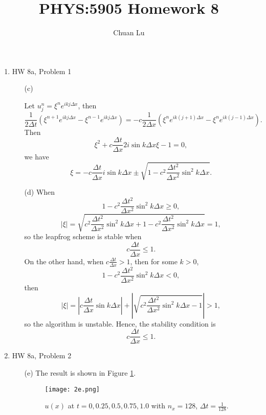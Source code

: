 \documentclass{article}
\begin{document}
\author{Chuan Lu}
\title{PHYS:5905 Homework 8}
\maketitle

\medskip

\begin{enumerate}

\item HW 8a, Problem 1

\begin{enumerate}

\item[(c)]

Let $u_{j}^n = \xi^ne^{ikj\Delta x} $, then 
$$
\frac{1}{2\Delta t} (\xi^{n+1}e^{ikj\Delta x} - \xi^{n-1}e^{ikj\Delta x}) = -c\frac{1}{2\Delta x} (\xi^{n}e^{ik(j+1)\Delta x} - \xi^{n}e^{ik(j-1)\Delta x}).
$$
Then
$$
\xi^2 + c\frac{\Delta t}{\Delta x} 2i\sin k\Delta x\xi -1 = 0, 
$$
we have 
$$
\xi = -c\frac{\Delta t}{\Delta x} i\sin k\Delta x \pm \sqrt{1-c^2\frac{\Delta t^2}{\Delta x^2}\sin^2 k\Delta x}.
$$

\item[(d)]
When 
$$
1-c^2\frac{\Delta t^2}{\Delta x^2}\sin^2 k\Delta x \ge 0,
$$
$$
|\xi| = \sqrt{c^2\frac{\Delta t^2}{\Delta x^2}\sin^2 k\Delta x + 1-c^2\frac{\Delta t^2}{\Delta x^2}\sin^2 k\Delta x} = 1,
$$
so the leapfrog scheme is stable when 
$$
c\frac{\Delta t}{\Delta x} \le 1.
$$
On the other hand, when $c\frac{\Delta t}{\Delta x} > 1$, then for some $k > 0$, 
$$
1-c^2\frac{\Delta t^2}{\Delta x^2}\sin^2 k\Delta x < 0,
$$
then
$$
|\xi| = |c\frac{\Delta t}{\Delta x}\sin k\Delta x| + |\sqrt{c^2\frac{\Delta t^2}{\Delta x^2}\sin^2 k\Delta x - 1}| > 1,
$$
so the algorithm is unstable. Hence, the stability condition is
$$
c\frac{\Delta t}{\Delta x} \le 1.
$$

\end{enumerate}

\item HW 8a, Problem 2

\begin{enumerate}
\item[(e)]
The result is shown in Figure \ref{Problem 2(e)}.

\begin{figure}[ht]
\centering
\texttt{[image: 2e.png]}
\caption{$u(x) $ at $t = 0, 0.25, 0.5, 0.75, 1.0$ with $n_x = 128 $, $\Delta t = \frac{1}{128}$.}
\label{Problem 2(e)}
\end{figure}


\end{enumerate}
\end{enumerate}
\end{document}
